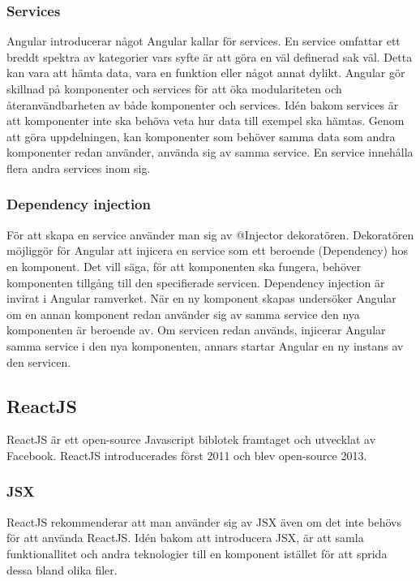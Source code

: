 
\subsubsection{Services}
Angular introducerar något Angular kallar för services. En service omfattar ett breddt spektra av kategorier vars syfte är att göra en väl definerad sak väl. Detta kan vara att hämta data, vara en funktion eller något annat dylikt. Angular gör skillnad på komponenter och services för att öka modulariteten och återanvändbarheten av både komponenter och services. Idén bakom services är att komponenter inte ska behöva veta hur data  till exempel ska hämtas. Genom att göra uppdelningen, kan komponenter som behöver samma data som andra komponenter redan använder, använda sig av samma service. En service innehålla flera andra services inom sig.


\subsubsection{Dependency injection}
För att skapa en service använder man sig av @Injector dekoratören. Dekoratören möjliggör för Angular att injicera en service som ett beroende (Dependency) hos en komponent. Det vill säga, för att komponenten ska fungera, behöver komponenten tillgång till den specifierade servicen. Dependency injection är invirat i Angular ramverket. När en ny komponent skapas undersöker Angular om en annan komponent redan använder sig av samma service den nya komponenten är beroende av. Om servicen redan används, injicerar Angular samma service i den nya komponenten, annars startar Angular en ny instans av den servicen.


\subsection{ReactJS}
ReactJS är ett open-source Javascript biblotek framtaget och utvecklat av Facebook. ReactJS introducerades först 2011 och blev open-source 2013. 


\subsubsection{JSX}
ReactJS rekommenderar att man använder sig av JSX även om det inte behövs för att använda ReactJS. Idén bakom att introducera JSX, är att samla funktionallitet och andra teknologier till en komponent istället för att sprida dessa bland olika filer.

